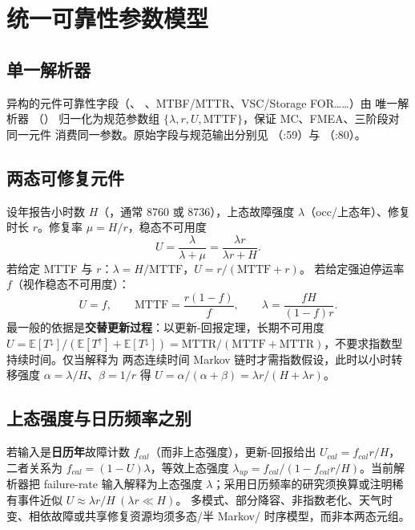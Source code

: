 \section{统一可靠性参数模型}\label{sec:rel-param}

\subsection{单一解析器}
异构的元件可靠性字段（、
、MTBF/MTTR、VSC/Storage FOR……）由
唯一解析器 （）
归一化为规范参数组 $\{\lambda,r,U,\mathrm{MTTF}\}$，保证 MC、FMEA、三阶段对同一元件
消费同一参数。原始字段与规范输出分别见 （:59）与
（:80）。

\subsection{两态可修复元件}
设年报告小时数 $H$（，通常 8760 或 8736），上态故障强度
$\lambda$（occ/上态年）、修复时长 $r$。修复率 $\mu=H/r$，稳态不可用度
\begin{equation}
U=\frac{\lambda}{\lambda+\mu}=\frac{\lambda r}{\lambda r+H}.
\end{equation}
若给定 MTTF 与 $r$：$\lambda=H/\mathrm{MTTF}$，$U=r/(\mathrm{MTTF}+r)$。
若给定强迫停运率 $f$（视作稳态不可用度）：
\begin{equation}
U=f,\qquad \mathrm{MTTF}=\frac{r(1-f)}{f},\qquad \lambda=\frac{fH}{(1-f)r}.
\end{equation}
最一般的依据是\textbf{交替更新过程}：以更新-回报定理，长期不可用度
$U=\mathbb E[T^\downarrow]/(\mathbb E[T^\uparrow]+\mathbb E[T^\downarrow])
=\mathrm{MTTR}/(\mathrm{MTTF}+\mathrm{MTTR})$，不要求指数型持续时间。仅当解释为
两态连续时间 Markov 链时才需指数假设，此时以小时转移强度 $\alpha=\lambda/H$、$\beta=1/r$
得 $U=\alpha/(\alpha+\beta)=\lambda r/(H+\lambda r)$。

\subsection{上态强度与日历频率之别}
若输入是\textbf{日历年}故障计数 $f_{cal}$（而非上态强度），更新-回报给出
$U_{cal}=f_{cal}r/H$，二者关系为 $f_{cal}=(1-U)\lambda$，等效上态强度
$\lambda_{up}=f_{cal}/(1-f_{cal}r/H)$。当前解析器把 failure-rate 输入解释为上态强度
$\lambda$；采用日历频率的研究须换算或注明稀有事件近似 $U\approx\lambda r/H\ (\lambda r\ll H)$。
多模式、部分降容、非指数老化、天气时变、相依故障或共享修复资源均须多态/半 Markov/
时序模型，而非本两态元组。

